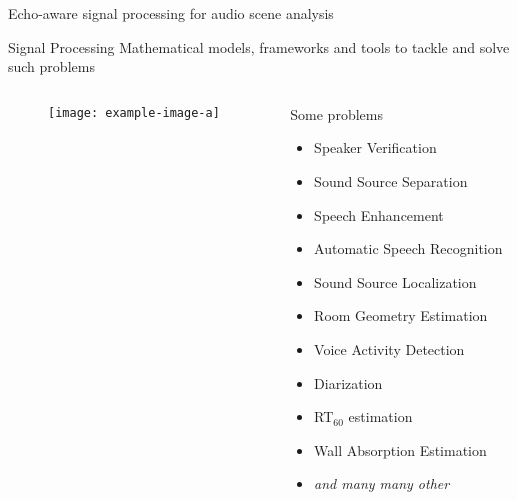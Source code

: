 \begin{frame}[t]{Echo-aware \alert{signal processing for audio scene analysis}}

    \begin{mydefblock}{Signal Processing}
        Mathematical models, frameworks and tools to tackle and solve such problems
    \end{mydefblock}

    \vfill
    \begin{columns}[onlytextwidth]
        \begin{column}{0.55\textwidth}
            \begin{figure}
                \texttt{[image: example-image-a]}
            \end{figure}
        \end{column}\hfill
        \begin{column}{0.42\textwidth}
            Some problems\hfill{}
            \begin{itemize}
                \item Speaker Verification
                \item Sound Source Separation 
                \item Speech Enhancement
                \item Automatic Speech Recognition 
                \item Sound Source Localization
                \item Room Geometry Estimation
                \item Voice Activity Detection
                \item Diarization
                \item RT$_{60}$ estimation
                \item Wall Absorption Estimation
                \item \textit{and many many other}
            \end{itemize}


\end{column}
\end{columns}
\end{frame}
